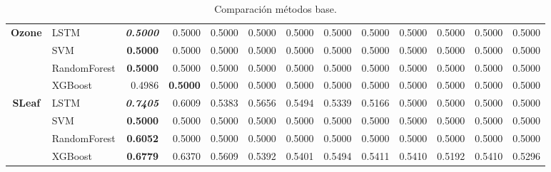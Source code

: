 \begin{table}[H]
\begin{adjustbox}{max width=14cm}
\begin{tabular}{|c|l|r|r|r|r|r|r|r|r|r|r|r|}
			\hline
			\textbf{Ozone}        & LSTM         & \textit{\textbf{0.5000}} & 0.5000          & 0.5000          & 0.5000                   & 0.5000 & 0.5000          & 0.5000 & 0.5000          & 0.5000                   & 0.5000          & 0.5000                   \\
			                      & SVM          & \textbf{0.5000}          & 0.5000          & 0.5000          & 0.5000                   & 0.5000 & 0.5000          & 0.5000 & 0.5000          & 0.5000                   & 0.5000          & 0.5000                   \\
			                      & RandomForest & \textbf{0.5000}          & 0.5000          & 0.5000          & 0.5000                   & 0.5000 & 0.5000          & 0.5000 & 0.5000          & 0.5000                   & 0.5000          & 0.5000                   \\
			                      & XGBoost      & 0.4986                   & \textbf{0.5000} & 0.5000          & 0.5000                   & 0.5000 & 0.5000          & 0.5000 & 0.5000          & 0.5000                   & 0.5000          & 0.5000                   \\
			\hline
			\textbf{SLeaf}        & LSTM         & \textit{\textbf{0.7405}} & 0.6009          & 0.5383          & 0.5656                   & 0.5494 & 0.5339          & 0.5166 & 0.5000          & 0.5000                   & 0.5000          & 0.5000                   \\
			                      & SVM          & \textbf{0.5000}          & 0.5000          & 0.5000          & 0.5000                   & 0.5000 & 0.5000          & 0.5000 & 0.5000          & 0.5000                   & 0.5000          & 0.5000                   \\
			                      & RandomForest & \textbf{0.6052}          & 0.5000          & 0.5000          & 0.5000                   & 0.5000 & 0.5000          & 0.5000 & 0.5000          & 0.5000                   & 0.5000          & 0.5000                   \\
			                      & XGBoost      & \textbf{0.6779}          & 0.6370          & 0.5609          & 0.5392                   & 0.5401 & 0.5494          & 0.5411 & 0.5410          & 0.5192                   & 0.5410          & 0.5296                   \\
			\hline
		\end{tabular}
	\end{adjustbox}
	\caption{Comparación métodos base.}
	\label{tab:all_comp_base}
\end{table}

